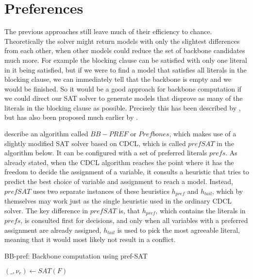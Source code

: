 \section{Preferences}
\label{ss:prefs}
The previous approaches still leave much of their efficiency to chance. Theoretically the solver might return models with only the slightest differences from each other, when other models could reduce the set of backbone candidates much more. For example the blocking clause can be satisfied with only one literal in it being satisfied, but if we were to find a model that satisfies all literals in the blocking clause, we can immediately tell that the backbone is empty and we would be finished. So it would be a good approach for backbone computation if we could direct our SAT solver to generate models that disprove as many of the literals in the blocking clause as possible. Precisely this has been described by \cite{PJ18}, but has also been proposed much earlier by \cite{kk01}. 

\cite{PJ18} describe an algorithm called $BB-PREF$ or $Prefbones$, which makes use of a slightly modified SAT solver based on CDCL, which is called $prefSAT$ in the algorithm below. It can be configured with a set of preferred literals $prefs$. As already stated, when the CDCL algorithm reaches the point where it has the freedom to decide the assignment of a variable, it consults a heuristic that tries to predict the best choice of variable and assignment to reach a model. Instead, $prefSAT$ uses two separate instances of these heuristics $h_{pref}$ and $h_{tail}$, which by themselves may work just as the single heuristic used in the ordinary CDCL solver. The key difference in $prefSAT$ is, that $h_{pref}$, which contains the literals in $prefs$, is consulted first for decisions, and only when all variables with a preferred assignment are already assigned, $h_{tail}$ is used to pick the most agreeable literal, meaning that it would most likely not result in a conflict.


\begin{algorithm}
\caption{{\sc BB-pref: Backbone computation using pref-SAT}}
\label{alg:pb0}
\DontPrintSemicolon
{}

$(\_,\nu_r) \gets SAT(F) $\;

\end{algorithm}

